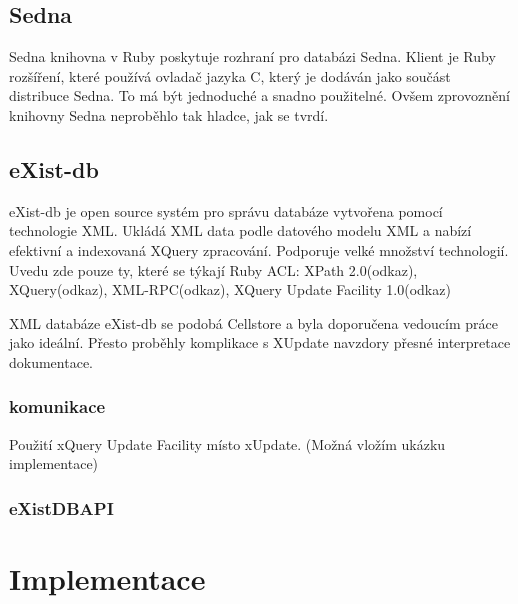 \documentclass[11pt,twoside,a4paper]{book}
\begin{document}
\subsection{Sedna}


Sedna knihovna v Ruby poskytuje rozhraní pro databázi Sedna. Klient je Ruby rozšíření, které používá ovladač jazyka C, který je dodáván jako součást distribuce Sedna. To má být jednoduché a snadno použitelné. Ovšem zprovoznění knihovny Sedna neproběhlo tak hladce, jak se tvrdí.

\subsection{eXist-db}
eXist-db je open source systém pro správu databáze vytvořena pomocí technologie XML. Ukládá XML data podle datového modelu XML a nabízí efektivní a indexovaná XQuery zpracování. Podporuje velké množství technologií. Uvedu zde pouze ty, které se týkají Ruby ACL: XPath 2.0(odkaz), XQuery(odkaz), XML-RPC(odkaz), XQuery Update Facility 1.0(odkaz)

XML databáze eXist-db se podobá Cellstore a byla doporučena vedoucím práce jako ideální. Přesto proběhly komplikace s XUpdate navzdory přesné interpretace dokumentace.

\subsubsection{komunikace}
Použití xQuery Update Facility místo xUpdate. (Možná vložím ukázku implementace)

\subsubsection{eXistDBAPI}
\section{Implementace}
\end{document}
